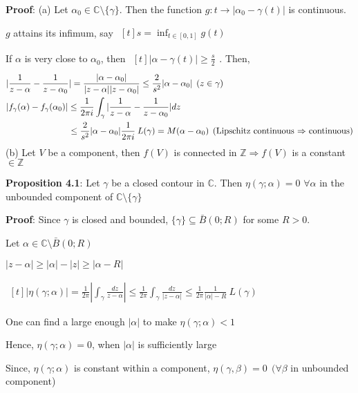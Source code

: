 \documentclass{article}
\begin{document}
\begin{flushleft}
\textbf{Proof}: (a) Let $\alpha_0 \in \mathds{C}\setminus \{\gamma\}$. Then the function $g:t \rightarrow |\alpha_0-\gamma(t)|$ is continuous.

$g$ attains its infimum, say $\begin{aligned}[t] s=\inf_{t\in[0,1]} g(t)\end{aligned}$

If $\alpha$ is very close to $\alpha_0$, then $\begin{aligned}[t]|\alpha-\gamma(t)|\geq \frac{s}{2}\end{aligned}$. Then,
\begin{align}
&|\frac{1}{z-\alpha}-\frac{1}{z-\alpha_0}|=\frac{|\alpha-\alpha_0|}{|z-\alpha||z-\alpha_0|}\leq \frac{2}{s^2}|\alpha-\alpha_0| \:\:(z\in \gamma)\nonumber\\
&|f_{\gamma}(\alpha)-f_{\gamma}(\alpha_0)|\leq \frac{1}{2\pi i} \int_{\gamma}^{}|\frac{1}{z-\alpha}-\frac{1}{z-\alpha_0}| dz\nonumber\\
&\hspace{25mm}\leq \frac{2}{s^2}|\alpha -\alpha_0|\frac{1}{2\pi i}\:L(\gamma)=M(\alpha-\alpha_0) \:\: (\text{Lipschitz continuous $\Rightarrow$ continuous})\nonumber
\end{align}
(b) Let $V$ be a component, then $f(V)$ is connected in $\mathds{Z}\Rightarrow f(V)$ is a constant $\in \mathds{Z}$

\textbf{Proposition 4.1}: Let $\gamma$ be a closed contour in $\mathds{C}$. Then $\eta(\gamma;\alpha)=0$ $\forall \alpha$ in the unbounded component of $\mathds{C}\setminus \{\gamma\}$

\textbf{Proof}: Since $\gamma$ is closed and bounded, $\{\gamma\}\subseteq \bar{B}(0;R)$ for some $R>0$.

Let $\alpha \in\mathds{C}\setminus \bar{B}(0;R)$ 

$|z-\alpha|\geq |\alpha|-|z|\geq |\alpha-R|$

$\begin{aligned}[t] |\eta(\gamma;\alpha)|=\frac{1}{2\pi}|\int_{\gamma}^{}\frac{dz}{z-\alpha}| \leq \frac{1}{2\pi} \int_{\gamma}^{}\frac{dz}{|z-\alpha|}\leq \frac{1}{2\pi} \frac{1}{|\alpha|-R}\:L(\gamma)\end{aligned}$

One can find a large enough $|\alpha|$ to make $\eta(\gamma;\alpha)<1$

Hence, $\eta(\gamma;\alpha)=0$, when $|\alpha|$ is sufficiently large 

Since, $\eta(\gamma;\alpha)$ is constant within a component, $\eta(\gamma,\beta)=0 \:\:(\forall \beta$ in unbounded component)


\end{flushleft}
\end{document}
